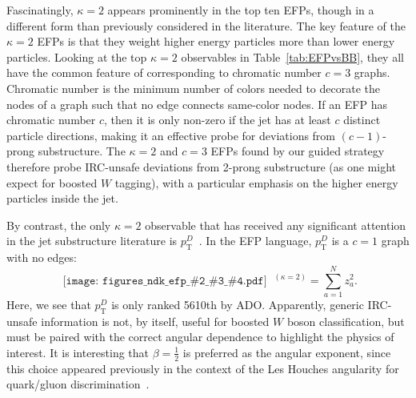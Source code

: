 \documentclass[aps,prd,twocolumn,superscriptaddress,preprintnumbers,nofootinbib,longbibliography,floatfix]{revtex4-1}
\newcommand{\Tab}[1]{Table~\ref{#1}}
\newcommand{\ndk}[4]{
	\begin{gathered}\texttt{[image: figures\_ndk\_efp\_\#2\_\#3\_\#4.pdf]}\end{gathered}
}
\begin{document}
Fascinatingly, $\kappa = 2$ appears prominently in the top ten EFPs, though in a different form than previously considered in the literature. The key feature of the $\kappa = 2$ EFPs is that they weight higher energy particles more than lower energy particles. Looking at the top $\kappa = 2$ observables in \Tab{tab:EFPvsBB}, they all have the common feature of corresponding to chromatic number $c = 3$ graphs. Chromatic number is the minimum number of colors needed to decorate the nodes of a graph such that no edge connects same-color nodes. If an EFP has chromatic number $c$, then it is only non-zero if the jet has at least $c$ distinct particle directions, making it an effective probe for deviations from $(c-1)$-prong substructure. The $\kappa = 2$ and $c = 3$ EFPs found by our guided strategy therefore probe IRC-unsafe deviations from 2-prong substructure (as one might expect for boosted $W$ tagging), with a particular emphasis on the higher energy particles inside the jet.

By contrast, the only $\kappa = 2$ observable that has received any significant attention in the jet substructure literature is $p_\textrm{T}^D$~\cite{Pandolfi:2012ima,Chatrchyan:2012sn}. In the EFP language, $p_\textrm{T}^D$ is a $c = 1$ graph with no edges:
\begin{equation}
	\ndk{0.045}{1}{0}{0}\ \!\!\!\!\!{}^{(\kappa = 2)} = \sum_{a = 1}^N z^{2}_a \label{eq:pTD}.
\end{equation}
Here, we see that $p_\textrm{T}^D$ is only ranked 5610th by ADO. Apparently, generic IRC-unsafe information is not, by itself, useful for boosted $W$ boson classification, but must be paired with the correct angular dependence to highlight the physics of interest. It is interesting that $\beta = \frac{1}{2}$ is preferred as the angular exponent, since this choice appeared previously in the context of the Les Houches angularity for quark/gluon discrimination~\cite{Gras:2017jty}.
\end{document}
